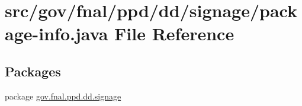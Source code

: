 \hypertarget{dd_2signage_2package-info_8java}{\section{src/gov/fnal/ppd/dd/signage/package-\/info.java File Reference}
\label{dd_2signage_2package-info_8java}
}
\subsection*{Packages}
\begin{DoxyCompactItemize}
\item 
package \hyperlink{namespacegov_1_1fnal_1_1ppd_1_1dd_1_1signage}{gov.\-fnal.\-ppd.\-dd.\-signage}
\end{DoxyCompactItemize}

